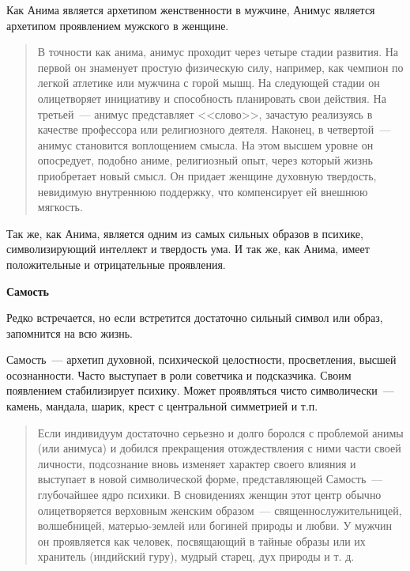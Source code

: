 \documentclass[a4paper,14pt,oneside]{memoir}
\begin{document}
Как Анима является архетипом женственности в мужчине, Анимус является архетипом проявлением мужского в женщине.

\begin{quotation}
В точности как анима, анимус проходит через четыре стадии развития. На первой он знаменует простую физическую силу, например, как чемпион по легкой атлетике или мужчина с горой мышц. На следующей стадии он олицетворяет инициативу и способность планировать свои действия. На третьей~--- анимус представляет <<слово>>, зачастую реализуясь в качестве профессора или религиозного деятеля. Наконец, в четвертой~--- анимус становится воплощением смысла. На этом высшем уровне он опосредует, подобно аниме, религиозный опыт, через который жизнь приобретает новый смысл. Он придает женщине духовную твердость, невидимую внутреннюю поддержку, что компенсирует ей внешнюю мягкость. 
\end{quotation}

Так же, как Анима, является одним из самых сильных образов в психике, символизирующий интеллект и твердость ума. И так же, как Анима, имеет положительные и отрицательные проявления.


\begin{center}
\bfseries{Самость}
\end{center} 

Редко встречается, но если встретится достаточно сильный символ или образ, запомнится на всю жизнь.

Самость~--- архетип духовной, психической целостности, просветления, высшей осознанности. Часто выступает в роли советчика и подсказчика. Своим появлением стабилизирует психику. Может проявляться чисто символически~--- камень, мандала, шарик, крест с центральной симметрией и т.п.

\begin{quotation}
Если индивидуум достаточно серьезно и долго боролся с проблемой анимы (или анимуса) и добился прекращения отождествления с ними части своей личности, подсознание вновь изменяет характер своего влияния и выступает в новой символической форме, представляющей Самость~--- глубочайшее ядро психики. В сновидениях женщин этот центр обычно олицетворяется верховным женским образом~--- священнослужительницей, волшебницей, матерью-землей или богиней природы и любви. У мужчин он проявляется как человек, посвящающий в тайные образы или их хранитель (индийский гуру), мудрый старец, дух природы и т. д. 
\end{quotation}
\end{document}
